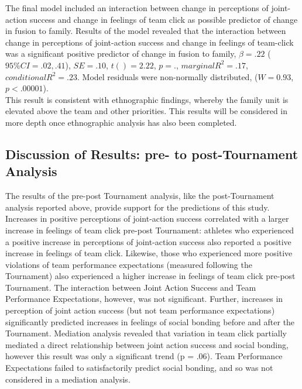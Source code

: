 
The final model included an interaction between change in perceptions of joint-action success and change in feelings of team click as possible predictor of change in fusion to family.  Results of the model revealed that the interaction between change in perceptions of joint-action success and change in feelings of team-click was a significant positive predictor of change in fusion to family, $\beta = .22$ ($95\% CI =  .02, .41$), $SE = .10$, $t() = 2.22$, $p = .$, $marginal R^2 = .17$, $conditional R^2 = .23$. Model residuals were non-normally distributed, ($W = 0.93$, $p < .00001$).\\

This result is consistent with ethnographic findings, whereby the family unit is elevated above the team and other priorities.  This results will be considered in more depth once ethnographic analysis has also been completed.



\subsection{Discussion of Results: pre- to post-Tournament Analysis}
  The results of the pre-post Tournament analysis, like the post-Tournament analysis reported above, provide support for the predictions of this study.  Increases in positive perceptions of joint-action success correlated with a larger increase in feelings of team click pre-post Tournament: athletes who experienced a positive increase in perceptions of joint-action success also reported a positive increase in feelings of team click.  Likewise, those who experienced more positive violations of team performance expectations (measured following the Tournament) also experienced a higher increase in feelings of team click pre-post Tournament.  The interaction between Joint Action Success and Team Performance Expectations, however, was not significant. Further, increases in perception of joint action success (but not team performance expectations) significantly predicted increases in feelings of social bonding before and after the Tournament.  Mediation analysis revealed that variation in team click partially mediated a direct relationship between joint action success and social bonding, however this result was only a significant trend (p = .06).  Team Performance Expectations failed to satisfactorily predict social bonding, and so was not considered in a mediation analysis.












